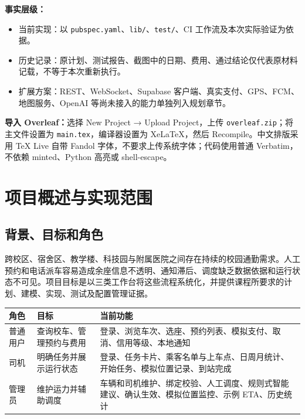 \documentclass[UTF8,fontset=fandol,zihao=-4,oneside]{ctexrep}
\newcommand{\pathcode}[1]{\nolinkurl{#1}}
\begin{document}
\textbf{事实层级：}
\begin{itemize}
\item 当前实现：以 \pathcode{pubspec.yaml}、\pathcode{lib/}、\pathcode{test/}、CI 工作流及本次实际验证为依据。
\item 历史记录：原计划、测试报告、截图中的日期、费用、通过结论仅代表原材料记载，不等于本次重新执行。
\item 扩展方案：REST、WebSocket、Supabase 客户端、真实支付、GPS、FCM、地图服务、OpenAI 等尚未接入的能力单独列入规划章节。
\end{itemize}

\textbf{导入 Overleaf：}选择 New Project → Upload Project，上传 \texttt{overleaf.zip}；将主文件设置为 \texttt{main.tex}，编译器设置为 XeLaTeX，然后 Recompile。中文排版采用 TeX Live 自带 Fandol 字体，不要求上传系统字体；代码使用普通 Verbatim，不依赖 minted、Python 高亮或 shell-escape。

\tableofcontents
\listoffigures
\clearpage
{}

\chapter{项目概述与实现范围}
\section{背景、目标和角色}
跨校区、宿舍区、教学楼、科技园与附属医院之间存在持续的校园通勤需求。人工预约和电话派车容易造成余座信息不透明、通知滞后、调度缺乏数据依据和运行状态不可见。项目目标是以三类工作台将这些流程系统化，并提供课程所要求的计划、建模、实现、测试及配置管理证据。

\begin{longtable}{p{2cm}p{5.7cm}p{7cm}}
\toprule 角色 & 目标 & 当前功能 \\ \midrule
普通用户 & 查询校车、管理预约与费用 & 登录、浏览车次、选座、预约列表、模拟支付、取消、信用等级、本地通知 \\
司机 & 明确任务并展示运行状态 & 登录、任务卡片、乘客名单与上车点、日周月统计、开始任务、模拟位置记录、到站完成 \\
管理员 & 维护运力并辅助调度 & 车辆和司机维护、绑定校验、人工调度、规则式智能建议、确认生效、模拟位置监控、示例 ETA、历史统计 \\
\bottomrule
\end{longtable}
\end{document}
